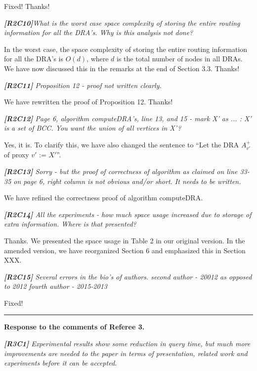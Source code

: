 \documentclass[11pt]{letter}
\newcommand{\vs}{\vspace{1ex}}
\newcommand{\svs}{\vspace{0.36ex}}
\begin{document}
Fixed! Thanks!

\vs
\noindent
{\em{\bf[R2C10]}What is the worst case space complexity of storing the entire routing information for all the DRA's. Why is this analysis not done?}
\svs

In the worst case, the space complexity of storing the entire routing information for all the DRA's is $O(d)$, where $d$ is the total number of nodes in all DRAs. We have now discussed this in the remarks at the end of Section 3.3. Thanks!



\vs
\noindent
{\em{\bf[R2C11]} Proposition 12 - proof not written clearly.}

\svs
We have rewritten the proof of Proposition 12. Thanks!

\vs
\noindent
{\em{\bf[R2C12]} Page 6, algorithm computeDRA's, line 13, and 15 - mark X' as ... : X' is a set of BCC. You want the union of all vertices in X'?}
\svs

Yes, it is. To clarify this, we have also changed the sentence to ``Let the DRA $A^+_{v'}$ of proxy $v'$ := $X'$''.


\vs
\noindent
{\em{\bf[R2C13]} Sorry - but the proof of correctness of algorithm as claimed on line 33-35 on page 6, right column is not obvious and/or short. It needs to be written.}

\svs
We have refined the correctness proof of algorithm computeDRA.


\vs
\noindent
{\em{\bf[R2C14]} All the experiments - how much space usage increased due to storage of extra information. Where is that presented?}

\svs
Thanks. We presented the space usage in Table 2 in our original version. In the amended version, we have reorganized Section 6 and emphasized this in Section XXX.

\vs
\noindent
{\em{\bf[R2C15]} Several errors in the bio's of authors.
second author - 20012 as opposed to 2012
fourth author - 2015-2013}

\svs
Fixed!










\vspace{2.8ex}
\hrule
\vspace{0.6ex}
{\bf Response to the comments of Referee 3.}


\vs
\noindent
{\em{\bf[R3C1]}
Experimental results show some reduction in query time, but much more improvements are needed to the paper in terms of presentation, related work and experiments before it can be accepted.}
\svs
\end{document}
